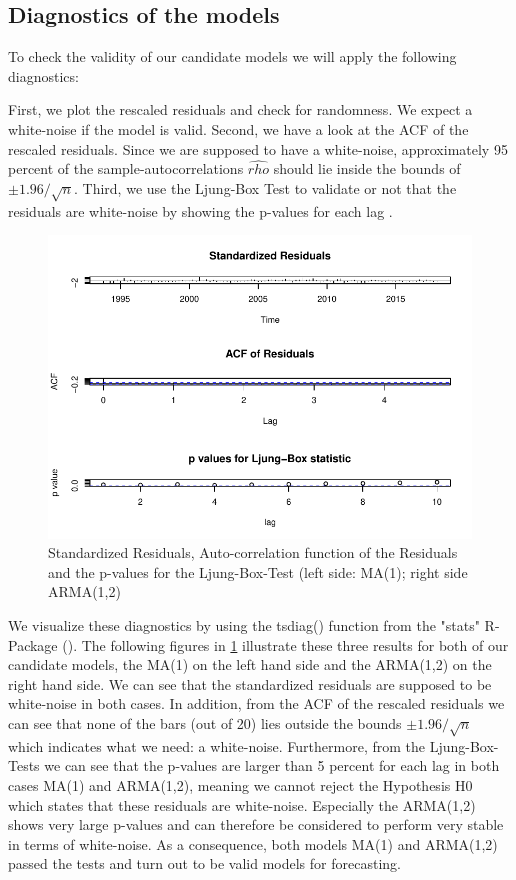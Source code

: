 \documentclass[11pt,a4paper]{article}
\begin{document}
\subsection{Diagnostics of the models}
To check the validity of our candidate models we will apply the following diagnostics:

First, we plot the rescaled residuals and check for randomness. We expect a white-noise if the model is valid. Second, we have a look at the ACF of the rescaled residuals. Since we are supposed to have a white-noise, approximately 95 percent of the sample-autocorrelations $\hat{rho}$ should lie inside the bounds of $\pm 1.96/\sqrt{n}$. 
Third, we use the Ljung-Box Test \citep{LjungBox78} to validate or not that the residuals are white-noise by showing the p-values for each lag \cite[Lecture~11]{chevalier18}.

\begin{figure} [ht]
    \centering
    \includegraphics[width=1\textwidth]{ts_diag_ma_1}
    \caption{Standardized Residuals, Auto-correlation function of the Residuals and the p-values for the Ljung-Box-Test (left side: MA(1); right side ARMA(1,2)}
    \label{fig:ts_diag_ma_1}
\end{figure}


We visualize these diagnostics by using the tsdiag() function from the "stats" R-Package (\citet{R_stats}).
The following figures in \cref{fig:ts_diag_ma_1} illustrate these three results for both of our candidate models, the MA(1) on the left hand side and the ARMA(1,2) on the right hand side.
We can see that the standardized residuals are supposed to be white-noise in both cases.
In addition, from the ACF of the rescaled residuals we can see that none of the bars (out of 20) lies outside the bounds $\pm 1.96 / \sqrt{n}$ which indicates what we need: a white-noise.
Furthermore, from the Ljung-Box-Tests we can see that the p-values are larger than 5 percent for each lag in both cases MA(1) and ARMA(1,2), meaning we cannot reject the Hypothesis H0 which states that these residuals are white-noise. Especially the ARMA(1,2) shows very large p-values and can therefore be considered to perform very stable in terms of white-noise. As a consequence, both models MA(1) and ARMA(1,2) passed the tests and turn out to be valid models for forecasting.
\end{document}
